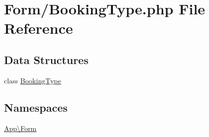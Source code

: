 \hypertarget{_booking_type_8php}{}\section{Form/\+Booking\+Type.php File Reference}
\label{_booking_type_8php}
\subsection*{Data Structures}
\begin{DoxyCompactItemize}
\item 
class \mbox{\hyperlink{class_app_1_1_form_1_1_booking_type}{Booking\+Type}}
\end{DoxyCompactItemize}
\subsection*{Namespaces}
\begin{DoxyCompactItemize}
\item 
 \mbox{\hyperlink{namespace_app_1_1_form}{App\textbackslash{}\+Form}}
\end{DoxyCompactItemize}

